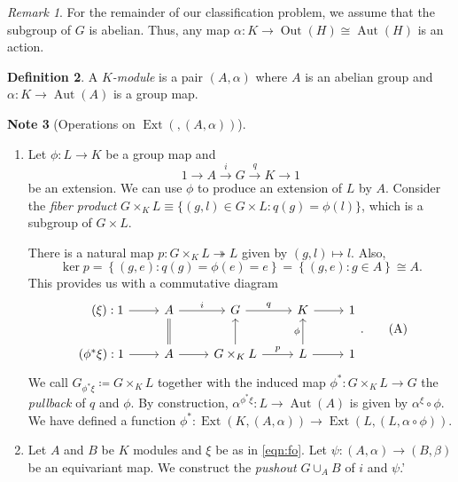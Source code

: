 \documentclass[10pt,letterpaper,cm]{nupset}
\theoremstyle{definition}
\newtheorem{definition}{Definition}[subsection]
\newtheorem{note}[definition]{Note}
\theoremstyle{theorem}
\theoremstyle{remark}
\newtheorem{remark}[definition]{Remark}
\newcommand{\1}{\mathbf{1}}
\newcommand{\0}{\vec 0}
\DeclareMathOperator{\aut}{Aut}
\DeclareMathOperator{\ext}{Ext}
\DeclareMathOperator{\out}{Out}
\begin{document}
\begin{remark}
 For the remainder of our classification problem, we assume that the subgroup of $G$ is abelian. Thus, any map $\alpha : K \to \out(H)\cong \aut(H)$ is an action.
\end{remark}

\begin{definition}
A \textit{$K$-module} is a pair $\left(A, \alpha\right)$ where $A$ is an abelian group and $\alpha : K \to \aut(A)$ is a group map.
\end{definition}

\begin{note}[Operations on $\ext(, (A, \alpha))$] $ $
\begin{enumerate}[label=(\arabic*)]
\item Let $\phi  : L \to K$ be a group map and $$1 \to A \overset{i}{\longrightarrow} G \overset{q}{\longrightarrow} K \to 1$$ be an extension. We can use $\phi$ to produce an extension of $L$ by $A$. Consider the \textit{fiber product} $G \times_K L \equiv \{(g, l) \in G \times L : q(g) = \phi(l)\}$, which is a subgroup of $G \times L$.

There is a natural map $p: G\times_K L \twoheadrightarrow L$ given by $(g, l) \mapsto l$. Also, $$\ker{p} = \left\{(g, e) : q(g) = \phi(e) =e \right\} = \left\{(g, e) : g \in A\right\} \cong A.$$ This provides us with a commutative diagram
\[ \label{eqn:fo}
\begin{tikzcd}
\quad (\xi): 1 \arrow[r] & A \arrow[r, "i"] & G \arrow[r, "q"] & K \arrow[r] & 1 \\
\left(\phi^{\ast}\xi\right): 1 \arrow[r] & A \arrow[r] \arrow[u, equal] & G\times_K L \arrow[r, "p"] \arrow[u] & L \arrow[u, "\phi"] \arrow[r] & 1
\end{tikzcd}. \tag{A}
\]
We call $G_{\phi^{\ast}\xi}\coloneqq  G\times_{K}L$ together with the induced map $\phi^{\ast} : G\times_{K}L\to G$ the \textit{pullback} of $q$ and $\phi$.  By construction, $\alpha^{\phi^{\ast}\xi} : L \to \aut(A)$ is given by $\alpha^{\xi} \circ \phi$. We have defined a function $\phi^{\ast} : \ext(K, (A, \alpha)) \to \ext(L, (L, \alpha \circ \phi))$. 

\item Let $A$ and $B$ be $K$ modules and $\xi$ be as in \eqref{eqn:fo}. Let $\psi: (A, \alpha) \to (B, \beta)$ be an equivariant map. We construct the \textit{pushout} $G \cup_A B$ of $i$ and $\psi$.'


\end{enumerate}
\end{note}
\end{document}
